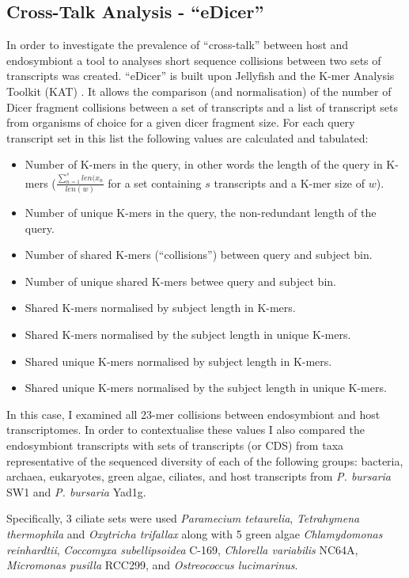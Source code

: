 \subsection{Cross-Talk Analysis - ``eDicer''}

In order to investigate the prevalence of ``cross-talk'' between 
host and endosymbiont a tool to analyses short sequence collisions between two sets
of transcripts was created.  ``eDicer'' is built upon Jellyfish \citep{Marcais2011}
and the K-mer Analysis Toolkit (KAT) \citep{ClavijoKAT}.  It allows
the comparison (and normalisation) of the number of Dicer fragment collisions
between a set of transcripts and a list of transcript sets from organisms
of choice for a given dicer fragment size.  
For each query transcript set in this list the following
values are calculated and tabulated:
\begin{itemize}
    \item Number of K-mers in the query, in other words the length of the query
        in K-mers (\(\frac{\sum^s_{n=1} len(x_{n}}{len(w)}\)
        for a set containing \(s\) transcripts and a K-mer size of \(w\)).
    \item Number of unique K-mers in the query, the non-redundant length of 
        the query.
    \item Number of shared  K-mers (``collisions'') between query and subject bin.
    \item Number of unique shared K-mers betwee query and subject bin.
    \item Shared K-mers normalised by subject length in K-mers.
    \item Shared K-mers normalised by the subject length in unique K-mers.
    \item Shared unique K-mers normalised by subject length in K-mers.
    \item Shared unique K-mers normalised by the subject length in unique K-mers.
\end{itemize}

In this case, I examined all 23-mer collisions between endosymbiont 
and host transcriptomes. In order to contextualise these
values I also compared the endosymbiont transcripts with 
sets of transcripts (or CDS) from taxa representative of the 
sequenced diversity of each of the
following groups: bacteria, archaea, eukaryotes, green algae, ciliates,
and host transcripts from \textit{P. bursaria} SW1 and \textit{P. bursaria} Yad1g.

Specifically, 3 ciliate sets were used \textit{Paramecium tetaurelia}, 
\textit{Tetrahymena thermophila} and \textit{Oxytricha trifallax} along with
5 green algae \textit{Chlamydomonas reinhardtii}, \textit{Coccomyxa subellipsoidea}
C-169, \textit{Chlorella variabilis} NC64A, \textit{Micromonas pusilla} RCC299, and
\textit{Ostreococcus lucimarinus}.


